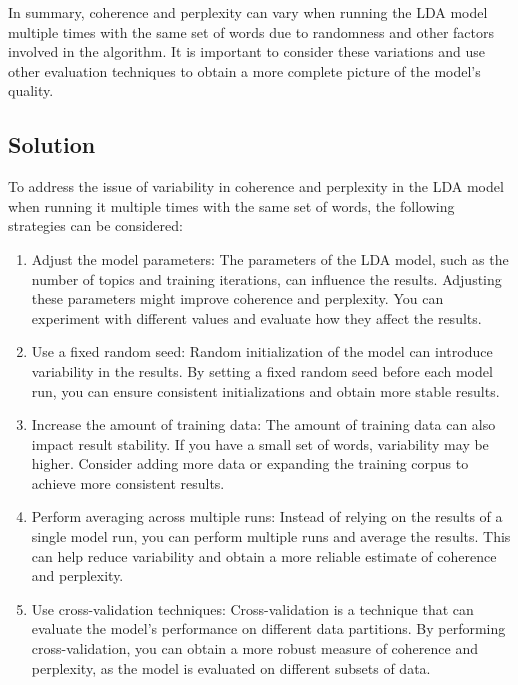 \documentclass[10pt]{article} %
\begin{document}
	In summary, coherence and perplexity can vary when running the LDA model multiple times with the same set of words due to randomness and other factors involved in the algorithm. It is important to consider these variations and use other evaluation techniques to obtain a more complete picture of the model's quality.
	

	
	\subsection{Solution}
	To address the issue of variability in coherence and perplexity in the LDA model when running it multiple times with the same set of words, the following strategies can be considered:
	\begin{enumerate}
		\item Adjust the model parameters: The parameters of the LDA model, such as the number of topics and training iterations, can influence the results. Adjusting these parameters might improve coherence and perplexity. You can experiment with different values and evaluate how they affect the results.
		
		\item Use a fixed random seed: Random initialization of the model can introduce variability in the results. By setting a fixed random seed before each model run, you can ensure consistent initializations and obtain more stable results.
		
		\item Increase the amount of training data: The amount of training data can also impact result stability. If you have a small set of words, variability may be higher. Consider adding more data or expanding the training corpus to achieve more consistent results.
		
		\item Perform averaging across multiple runs: Instead of relying on the results of a single model run, you can perform multiple runs and average the results. This can help reduce variability and obtain a more reliable estimate of coherence and perplexity.
		
		\item Use cross-validation techniques: Cross-validation is a technique that can evaluate the model's performance on different data partitions. By performing cross-validation, you can obtain a more robust measure of coherence and perplexity, as the model is evaluated on different subsets of data.
	\end{enumerate}
\end{document}
